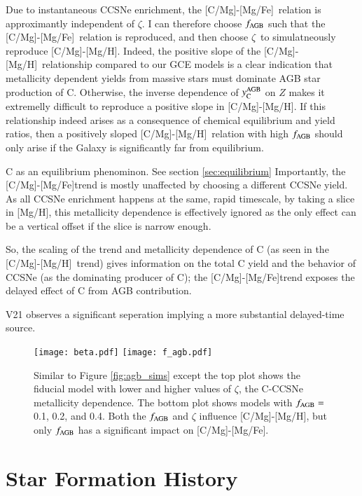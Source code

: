\documentclass[12pt,oneside]{report}
\newcommand{\caah}{[C/Mg]-[Mg/H]}
\newcommand{\caafe}{[C/Mg]-[Mg/Fe]}
\newcommand{\Ycagb}{\ensuremath{y_{\rm C}^{\rm AGB}}}
\begin{document}
Due to instantaneous CCSNe enrichment, the \caafe~relation is approximantly independent of $\zeta$. I can therefore choose $f_{\rm AGB}$ such that the \caafe~relation is reproduced, and then choose $\zeta$~to simulatneously reproduce \caah. Indeed, the positive slope of the \caah~relationship compared to our GCE models is a clear indication that metallicity dependent yields from massive stars must dominate AGB star production of C. Otherwise,  the inverse dependence of $\Ycagb$ on $Z$ makes it extremelly difficult to reproduce a positive slope in \caah. If this relationship indeed arises as a consequence of chemical equilibrium and yield ratios, then a positively sloped \caah~relation with high $f_{\rm AGB}$ should only arise if the Galaxy is significantly far from equilibrium. 

C as an equilibrium phenominon. See section \ref{sec:equilibrium} Importantly, the \caafe trend is mostly unaffected by choosing a different
CCSNe yield. As all CCSNe enrichment happens at the same, rapid timescale, by
taking a slice in [Mg/H], this metallicity dependence is effectively ignored as
the only effect can be a vertical offset if the slice is narrow enough. 

So, the scaling of the trend and metallicity dependence of C (as seen in
the \caah~trend) gives information on the total C yield and the behavior
of CCSNe (as the dominating producer of C);
the \caafe trend exposes the delayed effect of C from AGB contribution.

V21 observes a significant seperation implying a more substantial delayed-time source. 


\begin{figure}
\centering
\texttt{[image: beta.pdf]}
\texttt{[image: f\_agb.pdf]}

\caption[Adjusted yield models]{Similar to Figure \ref{fig:agb_sims} except the top plot shows the fiducial model with lower and higher values of $\zeta$, the C-CCSNe metallicity dependence. The bottom plot shows models with $f_{\rm AGB}=$0.1, 0.2, and 0.4. Both the $f_{\rm AGB}$ and $\zeta$ influence \caah, but only $f_{\rm AGB}$ has a significant impact on \caafe.}
\label{fig:beta_f}
\end{figure}



\section{Star Formation History} \label{sec:sfh}
\end{document}
